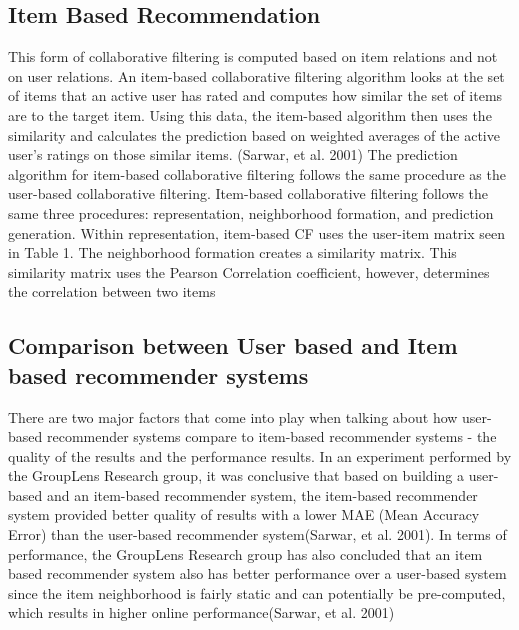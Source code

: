 \subsection{Item Based Recommendation}
This form of collaborative filtering is computed based on item relations and not on user relations. An item-based collaborative filtering algorithm looks at the set of items that an active user has rated and computes how similar the set of items are to the target item. Using this data, the item-based algorithm then uses the similarity and calculates the prediction based on weighted averages of the active user’s ratings on those similar items. (Sarwar, et al. 2001)
The prediction algorithm for item-based collaborative filtering follows the same procedure as the user-based collaborative filtering. Item-based collaborative filtering follows the same three procedures: representation, neighborhood formation, and prediction generation. Within representation, item-based CF uses the user-item matrix seen in Table 1. The neighborhood formation creates a similarity matrix. This  similarity matrix uses the Pearson Correlation coefficient, however, determines the correlation between two items
\subsection{Comparison between User based and Item based recommender systems}
There are two major factors that come into play when talking about how user-based recommender systems compare to item-based recommender systems - the quality of the results and the performance results. 
In an experiment performed by the GroupLens Research group, it was conclusive that based on building a user-based and an item-based recommender system, the item-based recommender system provided better quality of results with a lower MAE (Mean Accuracy Error) than the user-based recommender system(Sarwar, et al. 2001). 
In terms of performance, the GroupLens Research group has also concluded that an  item based recommender system also has better performance over a user-based system since the item neighborhood is fairly static and can potentially be pre-computed, which results in higher online performance(Sarwar, et al. 2001)
